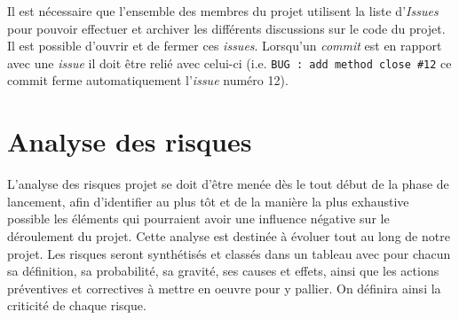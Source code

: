 \documentclass[10pt,a4paper]{article}
\begin{document}
Il est nécessaire que l'ensemble des membres du projet utilisent la liste d'\textit{Issues} pour pouvoir effectuer et archiver les différents discussions sur le code du projet. Il est possible d'ouvrir et de fermer ces \textit{issues}. Lorsqu'un \textit{commit} est en rapport avec une \textit{issue} il doit être relié avec celui-ci (i.e. \verb|BUG : add method close #12| ce commit ferme automatiquement l'\textit{issue} numéro 12).

\newpage
\section{Analyse des risques}
L’analyse des risques projet se doit d’être menée dès le tout début de la phase de lancement, afin d’identifier au plus tôt et de la manière la plus exhaustive possible les éléments qui pourraient avoir une influence négative sur le déroulement du projet. Cette analyse est destinée à évoluer tout au long de notre projet.
Les risques seront synthétisés et classés dans un tableau avec pour chacun sa définition, sa probabilité,
sa gravité, ses causes et effets, ainsi que les actions préventives et correctives à mettre en oeuvre pour y pallier. On définira ainsi la criticité de chaque risque.
\end{document}
